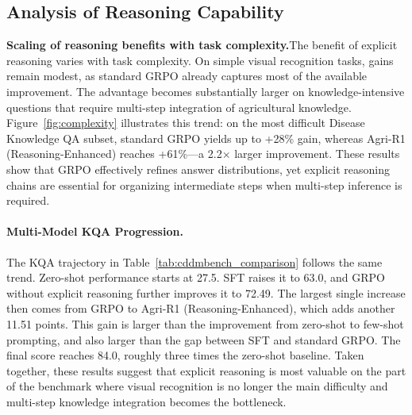 \documentclass[sigconf,anonymous,review]{acmart}
\begin{document}
\subsection{Analysis of Reasoning Capability}

\textbf{Scaling of reasoning benefits with task complexity.}The benefit of explicit reasoning varies with task complexity. On simple visual recognition tasks, gains remain modest, as standard GRPO already captures most of the available improvement. The advantage becomes substantially larger on knowledge-intensive questions that require multi-step integration of agricultural knowledge. Figure~\ref{fig:complexity} illustrates this trend: on the most difficult Disease Knowledge QA subset, standard GRPO yields up to +28\% gain, whereas Agri-R1 (Reasoning-Enhanced) reaches +61\%---a 2.2$\times$ larger improvement. These results show that GRPO effectively refines answer distributions, yet explicit reasoning chains are essential for organizing intermediate steps when multi-step inference is required.



\paragraph{\textbf{Multi-Model KQA Progression.}}
The KQA trajectory in Table~\ref{tab:cddmbench_comparison} follows the same trend. Zero-shot performance starts at 27.5. SFT raises it to 63.0, and GRPO without explicit reasoning further improves it to 72.49. The largest single increase then comes from GRPO to Agri-R1 (Reasoning-Enhanced), which adds another 11.51 points. This gain is larger than the improvement from zero-shot to few-shot prompting, and also larger than the gap between SFT and standard GRPO. The final score reaches 84.0, roughly three times the zero-shot baseline. Taken together, these results suggest that explicit reasoning is most valuable on the part of the benchmark where visual recognition is no longer the main difficulty and multi-step knowledge integration becomes the bottleneck.
\end{document}
